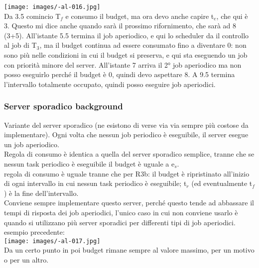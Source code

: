 \documentclass{article}
\begin{document}
\texttt{[image: images/-al-016.jpg]}\\
Da 3.5 comincio T$_{f}$ e consumo il budget, ma ora devo anche capire t$_{e}$, che qui è 3. Questo mi dice anche quando sarà il prossimo rifornimento, che sarà ad 8 (3+5). All'istante 5.5 termina il job aperiodico, e qui lo scheduler da il controllo al job di T$_{3}$, ma il budget continua ad essere consumato fino a diventare 0: non sono più nelle condizioni in cui il budget si preserva, e qui sta eseguendo un job con priorità minore del server. All'istante 7 arriva il 2° job aperiodico ma non posso eseguirlo perché il budget è 0, quindi devo aspettare 8. A 9.5 termina l'intervallo totalmente occupato, quindi posso eseguire job aperiodici.
\subsubsection{Server sporadico background}
Variante del server sporadico (ne esistono di verse via via sempre più costose da implementare). Ogni volta che nessun job periodico è eseguibile, il server esegue un job aperiodico.\\ Regola di consumo è identica a quella del server sporadico semplice, tranne che se nessun task periodico è eseguibile il budget è uguale a e$_{s}$. \\ regola di consumo è uguale tranne che per R3b: il budget è ripristinato all'inizio di ogni intervallo in cui nessun task periodico è eseguibile; t$_{r}$ (ed eventualmente t$_{f}$) è la fine dell'intervallo.\\ Conviene sempre implementare questo server, perché questo tende ad abbassare il tempi di risposta dei job aperiodici, l'unico caso in cui non conviene usarlo è quando si utilizzano più server sporadici per differenti tipi di job aperiodici.\\ esempio precedente:\\
\texttt{[image: images/-al-017.jpg]}\\ 
Da un certo punto in poi budget rimane sempre al valore massimo, per un motivo o per un altro.
\end{document}
